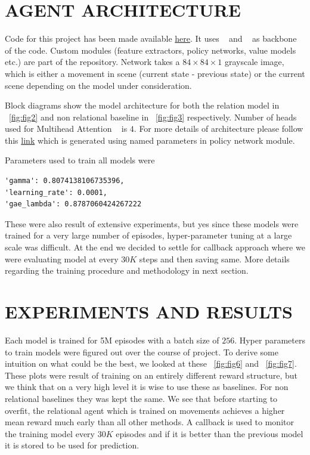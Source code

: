 \documentclass[english]{sobraep}
\begin{document}
\section{AGENT ARCHITECTURE}
Code for this project has been made available \href{https://github.com/thunderock/BiasNet/}{here}. It uses ~\cite{NEURIPS2019_9015} and ~\cite{stable-baselines3} as backbone of the code. Custom modules (feature extractors, policy networks, value models etc.) are part of the repository. Network takes a $84\times84\times1$ grayscale image, which is either a movement in scene (current state - previous state) or the current scene depending on the model under consideration.

Block diagrams show the model architecture for both the relation model in ~\ref{fig:fig2} and non relational baseline in ~\ref{fig:fig3} respectively. Number of heads used for Multihead Attention ~\cite{DBLP:journals/corr/VaswaniSPUJGKP17} is $4$. For more details of architecture please follow this \href{https://github.com/thunderock/BiasNet/blob/master/model_architecture.ipynb}{link} which is generated using named parameters in policy network module.

Parameters used to train all models were 
\begin{lstlisting}
'gamma': 0.8074138106735396, 
'learning_rate': 0.0001, 
'gae_lambda': 0.8787060424267222
\end{lstlisting}
These were also result of extensive experiments, but yes since these models were trained for a very large number of episodes, hyper-parameter tuning at a large scale was difficult. At the end we decided to settle for callback approach where we were evaluating model at every $30K$ steps and then saving same. More details regarding the training procedure and methodology in next section.


\section{EXPERIMENTS AND RESULTS}

Each model is trained for 5M episodes with a batch size of $256$. Hyper parameters to train models were figured out over the course of project. To derive some intuition on what could be the best, we looked at these ~\ref{fig:fig6} and ~\ref{fig:fig7}. These plots were result of training on an entirely different reward structure, but we think that on a very high level it is wise to use these as baselines. For non relational baselines they was kept the same. We see that before starting to overfit, the relational agent which is trained on movements achieves a higher mean reward much early than all other methods. A callback is used to monitor the training model every $30K$ episodes and if it is better than the previous model it is stored to be used for prediction.
\end{document}
